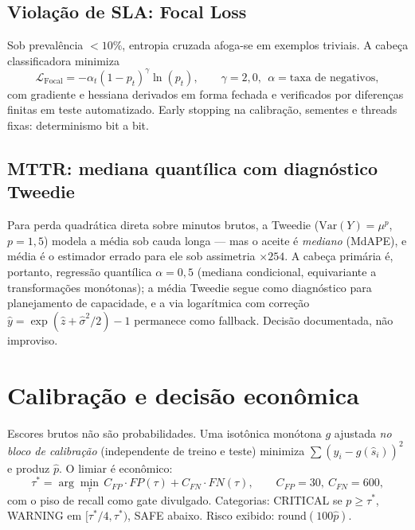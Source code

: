\documentclass[11pt,a4paper]{article}
\begin{document}
\subsection{Violação de SLA: Focal Loss}
Sob prevalência $<10\%$, entropia cruzada afoga-se em exemplos triviais. A
cabeça classificadora minimiza
\begin{equation}
\mathcal{L}_{\text{Focal}}=-\alpha_t(1-p_t)^\gamma\ln(p_t),\qquad
\gamma=2{,}0,\ \ \alpha=\text{taxa de negativos},
\end{equation}
com gradiente e hessiana derivados em forma fechada e verificados por
diferenças finitas em teste automatizado. Early stopping na calibração,
sementes e threads fixas: determinismo bit a bit.

\subsection{MTTR: mediana quantílica com diagnóstico Tweedie}
Para perda quadrática direta sobre minutos brutos, a Tweedie
($\mathrm{Var}(Y)=\mu^p$, $p=1{,}5$) modela a média sob cauda longa --- mas o
aceite é \emph{mediano} (MdAPE), e média é o estimador errado para ele sob
assimetria $\times 254$. A cabeça primária é, portanto, regressão quantílica
$\alpha=0{,}5$ (mediana condicional, equivariante a transformações monótonas);
a média Tweedie segue como diagnóstico para planejamento de capacidade, e a
via logarítmica com correção $\hat{y}=\exp(\hat{z}+\hat{\sigma}^2/2)-1$
permanece como fallback. Decisão documentada, não improviso.

\section{Calibração e decisão econômica}

Escores brutos não são probabilidades. Uma isotônica monótona
$g$ ajustada \emph{no bloco de calibração} (independente de treino e teste)
minimiza $\sum(y_i-g(\hat{s}_i))^2$ e produz $\hat p$. O limiar é econômico:
\begin{equation}
\tau^*=\arg\min_\tau\,C_{FP}\cdot FP(\tau)+C_{FN}\cdot FN(\tau),\qquad
C_{FP}=30,\ C_{FN}=600,
\end{equation}
com o piso de recall como gate divulgado. Categorias: CRITICAL se
$p\ge\tau^*$, WARNING em $[\tau^*/4,\tau^*)$, SAFE abaixo. Risco exibido:
$\mathrm{round}(100\hat p)$.
\end{document}

